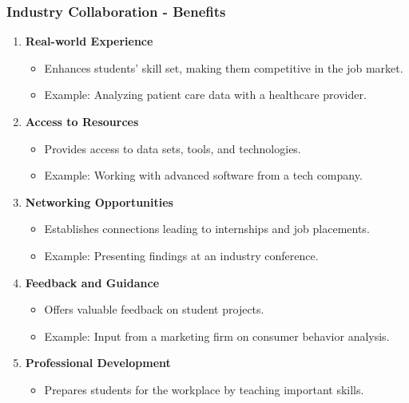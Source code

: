 \documentclass{beamer}
\begin{document}
\begin{frame}[fragile]
    \frametitle{Industry Collaboration - Benefits}
    \begin{enumerate}
        \item \textbf{Real-world Experience}
        \begin{itemize}
            \item Enhances students' skill set, making them competitive in the job market.
            \item Example: Analyzing patient care data with a healthcare provider.
        \end{itemize}

        \item \textbf{Access to Resources}
        \begin{itemize}
            \item Provides access to data sets, tools, and technologies.
            \item Example: Working with advanced software from a tech company.
        \end{itemize}
        
        \item \textbf{Networking Opportunities}
        \begin{itemize}
            \item Establishes connections leading to internships and job placements.
            \item Example: Presenting findings at an industry conference.
        \end{itemize}

        \item \textbf{Feedback and Guidance}
        \begin{itemize}
            \item Offers valuable feedback on student projects.
            \item Example: Input from a marketing firm on consumer behavior analysis.
        \end{itemize}

        \item \textbf{Professional Development}
        \begin{itemize}
            \item Prepares students for the workplace by teaching important skills.
        \end{itemize}
    \end{enumerate}
\end{frame}
\end{document}
